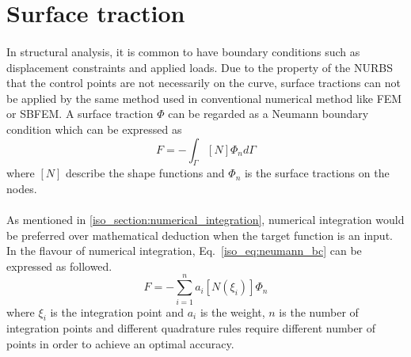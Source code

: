 \section{Surface traction}
\label{iso_section:surface_traction}
\paragraph{}
In structural analysis, it is common to have boundary conditions such as displacement constraints and applied loads.
Due to the property of the NURBS that the control points are not necessarily on the curve, surface tractions can not be applied by the same method used in conventional numerical method like FEM or SBFEM.
A surface traction $\Phi$ can be regarded as a Neumann boundary condition which can be expressed as
    \begin{equation}
        {F}=-\int_{\Gamma}
        [N]
        \Phi_n
        d\Gamma
    \label{iso_eq:neumann_bc}
    \end{equation}
where $[N]$ describe the shape functions and $\Phi_n$ is the surface tractions on the nodes.

\paragraph{}
As mentioned in \ref{iso_section:numerical_integration}, numerical integration would be preferred over mathematical deduction when the target function is an input.
In the flavour of numerical integration, Eq.~\ref{iso_eq:neumann_bc} can be expressed as followed.
    \begin{equation}
        {F}=-\sum_{i=1}^n
        a_i
        [N(\xi_i)]
        \Phi_n
    \label{iso_eq:neumann_bc_numerical}
    \end{equation}
where $\xi_i$ is the integration point and $a_i$ is the weight,
$n$ is the number of integration points and different quadrature rules require different number of points in order to achieve an optimal accuracy.

